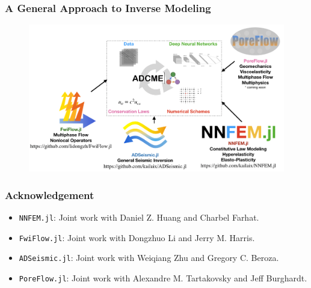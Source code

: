 \documentclass{beamer}
\begin{document}
\begin{frame}
	\frametitle{A General Approach to Inverse Modeling}
	\begin{figure}[hbt]
  \includegraphics[width=1.0\textwidth]{../summary.png}
\end{figure}

\end{frame}

\begin{frame}
	\frametitle{Acknowledgement}
	\begin{itemize}
		\item \texttt{NNFEM.jl}: Joint work with Daniel Z. Huang and Charbel Farhat.
		\item \texttt{FwiFlow.jl}: Joint work with Dongzhuo Li and Jerry M. Harris. 
		\item \texttt{ADSeismic.jl}: Joint work with Weiqiang Zhu and Gregory C. Beroza. 
		\item \texttt{PoreFlow.jl}: Joint work with Alexandre M. Tartakovsky and Jeff Burghardt.
	\end{itemize}
\end{frame}



\end{document}
